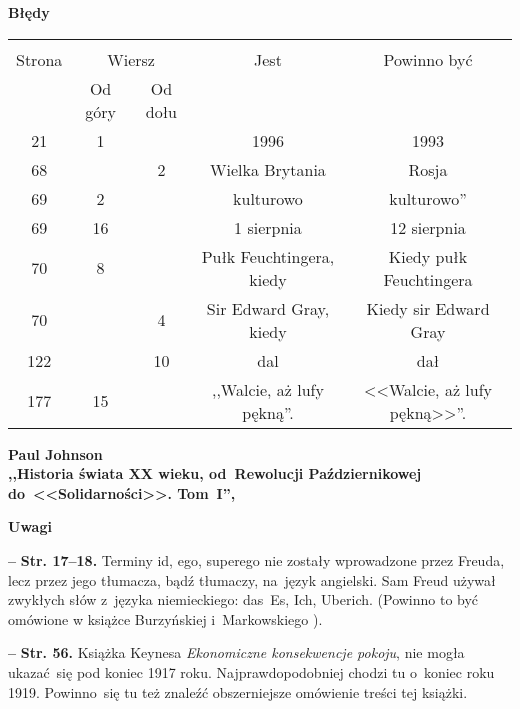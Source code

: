 \documentclass[a4paper,11pt]{article}
\newcommand{\spaceTwo}{2em}
\newcommand{\spaceFour}{0.5em}
\newcommand{\tb}{\textbf}
\newcommand{\noi}{\noindent}
\newcommand{\start}{\noi \tb{--} {}}
\newcommand{\Center}[1]{\begin{center} #1 \end{center}}
\newcommand{\CenterTB}[1]{\Center{\tb{#1}}}
\newcommand{\Str}[1]{\tb{Str. #1.}}
\newcommand{\Work}[1]{ \begin{center} {\large \tb{#1}} \end{center} }
\begin{document}
\CenterTB{Błędy}
\begin{center}
  \begin{tabular}{|c|c|c|c|c|}
    \hline
    & \multicolumn{2}{c|}{} & & \\
    Strona & \multicolumn{2}{c|}{Wiersz}& Jest & Powinno być \\ \cline{2-3}
    & Od góry & Od dołu &  &  \\ \hline
    21 & 1 & & 1996 & 1993 \\
    68 & & 2 & Wielka Brytania & Rosja \\
    69 & 2 & & kulturowo & kulturowo'' \\
    69 & 16 & & 1 sierpnia & 12 sierpnia \\
    70 & 8 & & Pułk Feuchtingera, kiedy & Kiedy pułk Feuchtingera \\
    70 & & 4 & Sir Edward Gray, kiedy & Kiedy sir Edward Gray \\
    122 & & 10 & dal & dał \\
    177 & 15 & & ,,Walcie, aż lufy pękną''.
           & <<Walcie, aż lufy pękną>>''. \\
    \hline
  \end{tabular}
\end{center}

\vspace{\spaceTwo}





\Work{
  Paul Johnson \\
  ,,Historia świata XX wieku, od~Rewolucji Październikowej \\
  do~<<Solidarności>>. Tom~I'',
  \cite{JohnsonHistoriaSwiataXXWiekuvI09} }


\CenterTB{Uwagi}

\start \Str{17--18} Terminy id, ego, superego nie zostały wprowadzone
przez Freuda, lecz przez jego tłumacza, bądź tłumaczy, na~język
angielski. Sam Freud używał zwykłych słów z~języka niemieckiego:
das~Es, Ich, Uberich. (Powinno to być omówione w książce Burzyńskiej
i~Markowskiego \cite{BM09}).

\vspace{\spaceFour}


\start \Str{56} Książka Keynesa \emph{Ekonomiczne konsekwencje
  pokoju}, nie mogła ukazać~się pod koniec 1917 roku.
Najprawdopodobniej chodzi tu o~koniec roku 1919. Powinno~się tu też
znaleźć obszerniejsze omówienie treści tej książki.
\end{document}
